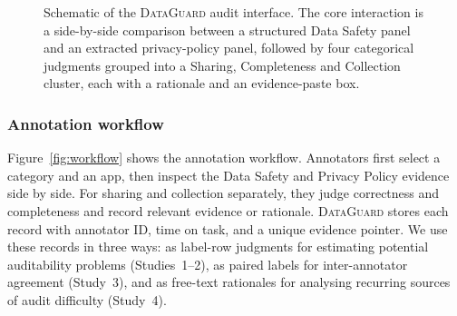 \documentclass[11pt,a4paper]{article}
\newcommand{\dataguard}{\textsc{DataGuard}}
\begin{document}
\begin{figure}[t]
\caption{Schematic of the \dataguard{} audit interface. The core
interaction is a side-by-side comparison between a structured Data Safety
panel and an extracted privacy-policy panel, followed by four categorical
judgments grouped into a Sharing, Completeness and Collection cluster,
each with a rationale and an evidence-paste box.}
\label{fig:interface}
\end{figure}

\subsubsection{Annotation workflow}
\label{subsec:workflow}
Figure~\ref{fig:workflow} shows the annotation workflow. Annotators
first select a category and an app, then inspect the Data Safety and
Privacy Policy evidence side by side. For sharing and collection
separately, they judge correctness and completeness and record relevant
evidence or rationale. \dataguard{} stores each record with annotator
ID, time on task, and a unique evidence pointer. We use these records in
three ways: as label-row judgments for estimating potential auditability
problems (Studies~1--2), as paired labels for inter-annotator agreement
(Study~3), and as free-text rationales for analysing recurring sources
of audit difficulty (Study~4).
\end{document}
